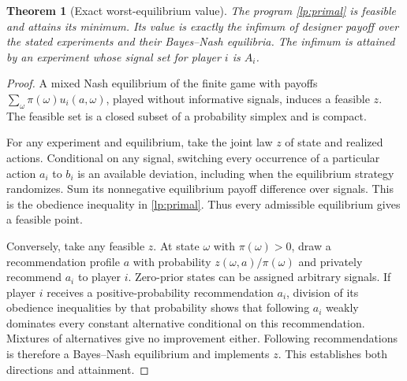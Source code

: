 \documentclass[11pt]{article}
\newtheorem{theorem}{Theorem}
\theoremstyle{definition}
\theoremstyle{remark}
\begin{document}
\begin{theorem}[Exact worst-equilibrium value]
The program \eqref{lp:primal} is feasible and attains its minimum. Its value is exactly the infimum of designer payoff over the stated experiments and their Bayes--Nash equilibria. The infimum is attained by an experiment whose signal set for player $i$ is $A_i$.
\end{theorem}
\begin{proof}
A mixed Nash equilibrium of the finite game with payoffs $\sum_\omega\pi(\omega)u_i(a,\omega)$, played without informative signals, induces a feasible $z$. The feasible set is a closed subset of a probability simplex and is compact.

For any experiment and equilibrium, take the joint law $z$ of state and realized actions. Conditional on any signal, switching every occurrence of a particular action $a_i$ to $b_i$ is an available deviation, including when the equilibrium strategy randomizes. Sum its nonnegative equilibrium payoff difference over signals. This is the obedience inequality in \eqref{lp:primal}. Thus every admissible equilibrium gives a feasible point.

Conversely, take any feasible $z$. At state $\omega$ with $\pi(\omega)>0$, draw a recommendation profile $a$ with probability $z(\omega,a)/\pi(\omega)$ and privately recommend $a_i$ to player $i$. Zero-prior states can be assigned arbitrary signals. If player $i$ receives a positive-probability recommendation $a_i$, division of its obedience inequalities by that probability shows that following $a_i$ weakly dominates every constant alternative conditional on this recommendation. Mixtures of alternatives give no improvement either. Following recommendations is therefore a Bayes--Nash equilibrium and implements $z$. This establishes both directions and attainment.
\end{proof}
\end{document}
